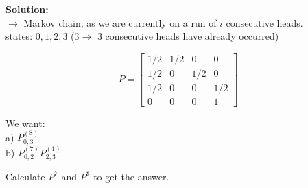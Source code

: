 \textbf{Solution:} \\
$\rightarrow$ Markov chain, as we are currently on a run of $i$ consecutive heads. \\
states: $0, 1, 2, 3$ ($3 \rightarrow$ 3 consecutive heads have already occurred)

\[ P = \begin{bmatrix} 1/2 & 1/2 & 0 & 0 \\ 1/2 & 0 & 1/2 & 0 \\ 1/2 & 0 & 0 & 1/2 \\ 0 & 0 & 0 & 1 \end{bmatrix} \]

We want: \\
a) $P_{0,3}^{(8)}$ \\
b) $P_{0,2}^{(7)} P_{2,3}^{(1)}$

Calculate $P^7$ and $P^8$ to get the answer.